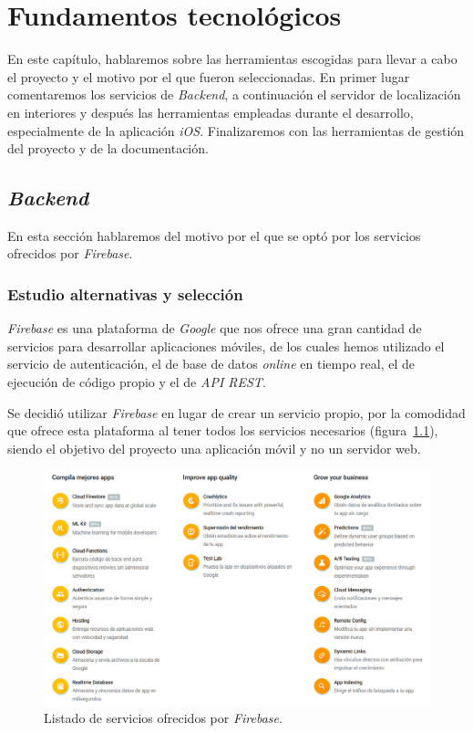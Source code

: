 \chapter{Fundamentos tecnológicos}
En este capítulo, hablaremos sobre las herramientas escogidas para llevar a cabo el proyecto y el motivo por el que fueron seleccionadas.
En primer lugar comentaremos los servicios de \textit{Backend}, a continuación el servidor de localización en interiores y después las herramientas empleadas durante el desarrollo, especialmente de la aplicación \textit{iOS}. Finalizaremos con las herramientas de gestión del proyecto y de la documentación.

\section{\textit{Backend}}
En esta sección hablaremos del motivo por el que se optó por los servicios ofrecidos por \textit{Firebase}.

\subsection{Estudio alternativas y selección} 
\textit{Firebase} \cite{google_firebase_nodate} es una plataforma de \textit{Google} que nos ofrece una gran cantidad de servicios para desarrollar aplicaciones móviles, de los cuales hemos utilizado el servicio de autenticación, el de base de datos \textit{online} en tiempo real, el de ejecución de código propio y el de \textit{API REST}.

Se decidió utilizar \textit{Firebase} en lugar de crear un servicio propio, por la comodidad que ofrece esta plataforma al tener todos los servicios necesarios (figura~\ref{fig:firebase-services}), siendo el objetivo del proyecto una aplicación móvil y no un servidor web.

\begin{figure}[tbp]
\begin{center}
\includegraphics[scale=0.5]{figures/firebase.png}
\caption{Listado de servicios ofrecidos por \textit{Firebase}.\label{fig:firebase-services}}
\end{center}
\end{figure}

